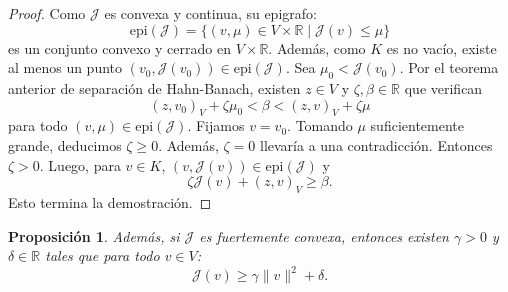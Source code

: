 \documentclass[12pt]{book}
\newtheorem{proposition}{Proposición}
\theoremstyle{definition}
\theoremstyle{plain}
\theoremstyle{remark}
\begin{document}
\begin{proof}
Como $\mathcal{J}$ es convexa y continua, su epigrafo:
\[
\text{epi}(\mathcal{J}) = \{(v, \mu) \in V \times \mathbb{R} \mid \mathcal{J}(v) \leq \mu\}
\]
es un conjunto convexo y cerrado en $V \times \mathbb{R}$. Además, como $K$ es no vacío, existe al menos un punto $(v_0, \mathcal{J}(v_0)) \in \text{epi}(\mathcal{J})$.
Sea $\mu_0 < \mathcal{J}(v_0)$.
Por el {teorema anterior de separación de Hahn-Banach}, existen %
%
$z\in V$ y $\zeta, \beta \in \mathbb{R}$ que verifican
\[
(z,v_0)_V + \zeta \mu_0 < \beta
< (z,v)_V + \zeta \mu 
\]
para todo $(v, \mu) \in \text{epi}(\mathcal{J})$. Fijamos $v=v_0$. Tomando $\mu$ suficientemente grande, deducimos $\zeta \geq 0$. Además, $\zeta = 0$ llevaría a una contradicción. Entonces $\zeta > 0$. Luego, para $v \in K$, $(v, \mathcal{J}(v)) \in \text{epi}(\mathcal{J})$ y
\[
\zeta \mathcal{J}(v) + (z,v)_V \geq \beta. 
\]
Esto termina la demostración. 
%
\end{proof}

\begin{proposition} \label{convexafhahnbanach}
Además, si $\mathcal{J}$ es fuertemente convexa, entonces existen $\gamma > 0$ y $\delta \in \mathbb{R}$ tales que para todo $v \in V$:
\[
\mathcal{J}(v) \geq \gamma \|v\|^2 + \delta.
\]
\end{proposition}
\end{document}
